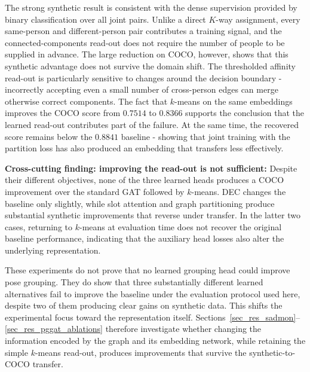The strong synthetic result is consistent with the dense supervision
provided by binary classification over all joint pairs.
Unlike a direct $K$-way assignment,
every same-person and different-person pair contributes a training signal,
and the connected-components read-out does not require the number
of people to be supplied in advance.
The large reduction on COCO, however,
shows that this synthetic advantage does not survive the domain shift.
The thresholded affinity read-out is particularly sensitive to changes
around the decision boundary -
incorrectly accepting even a small number of cross-person edges
can merge otherwise correct components.
The fact that $k$-means on the same embeddings improves the COCO score
from $0.7514$ to $0.8366$ supports the conclusion that the learned
read-out contributes part of the failure.
At the same time,
the recovered score remains below the $0.8841$ baseline -
showing that joint training with the partition loss has also produced
an embedding that transfers less effectively.

\textbf{Cross-cutting finding: improving the read-out is not sufficient:}
Despite their different objectives,
none of the three learned heads produces a COCO improvement
over the standard GAT followed by $k$-means.
DEC changes the baseline only slightly,
while slot attention and graph partitioning produce substantial
synthetic improvements that reverse under transfer.
In the latter two cases,
returning to $k$-means at evaluation time does not recover the original
baseline performance,
indicating that the auxiliary head losses also alter the underlying
representation.

These experiments do not prove that no learned grouping head could
improve pose grouping.
They do show that three substantially different learned alternatives
fail to improve the baseline under the evaluation protocol used here,
despite two of them producing clear gains on synthetic data.
This shifts the experimental focus toward the representation itself.
Sections~\ref{sec_res_sadmon}--\ref{sec_res_pggat_ablations} therefore
investigate whether changing the information encoded by the graph
and its embedding network,
while retaining the simple $k$-means read-out,
produces improvements that survive the synthetic-to-COCO transfer.
